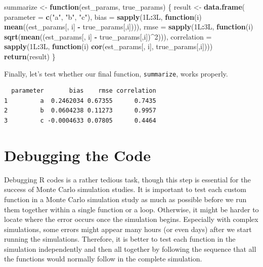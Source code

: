 \documentclass[
]{book}
\newenvironment{Shaded}{\begin{snugshade}}{\end{snugshade}}
\newcommand{\ControlFlowTok}[1]{\textcolor[rgb]{0.13,0.29,0.53}{\textbf{#1}}}
\newcommand{\DataTypeTok}[1]{\textcolor[rgb]{0.13,0.29,0.53}{#1}}
\newcommand{\DecValTok}[1]{\textcolor[rgb]{0.00,0.00,0.81}{#1}}
\newcommand{\KeywordTok}[1]{\textcolor[rgb]{0.13,0.29,0.53}{\textbf{#1}}}
\newcommand{\NormalTok}[1]{#1}
\newcommand{\OperatorTok}[1]{\textcolor[rgb]{0.81,0.36,0.00}{\textbf{#1}}}
\newcommand{\StringTok}[1]{\textcolor[rgb]{0.31,0.60,0.02}{#1}}
\begin{document}
\begin{Shaded}
\begin{Highlighting}[]
\NormalTok{summarize <-}\StringTok{ }\ControlFlowTok{function}\NormalTok{(est_params, true_params) \{}
\NormalTok{  result <-}\StringTok{ }\KeywordTok{data.frame}\NormalTok{(}
    \DataTypeTok{parameter =} \KeywordTok{c}\NormalTok{(}\StringTok{"a"}\NormalTok{, }\StringTok{"b"}\NormalTok{, }\StringTok{"c"}\NormalTok{),}
    \DataTypeTok{bias =} \KeywordTok{sapply}\NormalTok{(1L}\OperatorTok{:}\NormalTok{3L, }\ControlFlowTok{function}\NormalTok{(i) }\KeywordTok{mean}\NormalTok{((est_params[, i] }\OperatorTok{-}\StringTok{ }\NormalTok{true_params[,i]))),}
    \DataTypeTok{rmse =} \KeywordTok{sapply}\NormalTok{(1L}\OperatorTok{:}\NormalTok{3L, }\ControlFlowTok{function}\NormalTok{(i) }\KeywordTok{sqrt}\NormalTok{(}\KeywordTok{mean}\NormalTok{((est_params[, i] }\OperatorTok{-}\StringTok{ }\NormalTok{true_params[,i])}\OperatorTok{^}\DecValTok{2}\NormalTok{))),}
    \DataTypeTok{correlation =} \KeywordTok{sapply}\NormalTok{(1L}\OperatorTok{:}\NormalTok{3L, }\ControlFlowTok{function}\NormalTok{(i) }\KeywordTok{cor}\NormalTok{(est_params[, i], true_params[,i])))}
  \KeywordTok{return}\NormalTok{(result)}
\NormalTok{\}}
\end{Highlighting}
\end{Shaded}

Finally, let's test whether our final function, \texttt{summarize}, works properly.

\begin{Shaded}
\end{Shaded}

\begin{verbatim}
  parameter       bias    rmse correlation
1         a  0.2462034 0.67355      0.7435
2         b  0.0604238 0.11273      0.9957
3         c -0.0004633 0.07805      0.4464
\end{verbatim}

\hypertarget{debugging-the-code}{%
\section{Debugging the Code}\label{debugging-the-code}}

Debugging R codes is a rather tedious task, though this step is essential for the success of Monte Carlo simulation studies. It is important to test each custom function in a Monte Carlo simulation study as much as possible before we run them together within a single function or a loop. Otherwise, it might be harder to locate where the error occurs once the simulation begins. Especially with complex simulations, some errors might appear many hours (or even days) after we start running the simulations. Therefore, it is better to test each function in the simulation independently and then all together by following the sequence that all the functions would normally follow in the complete simulation.
\end{document}
